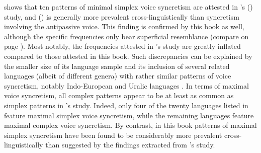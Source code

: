  shows that ten patterns of minimal simplex voice syncretism are attested in \citeauthor{geniusiene:1987}’s (\citeyear{geniusiene:1987}) study, and  () is generally more prevalent cross-linguistically than syncretism involving the antipassive voice. This finding is confirmed by this book as well, although the specific frequencies only bear superficial resemblance (compare  on page \pageref{tab:ch6:voice-syncretism-simplex}). Most notably, the frequencies attested in \citeauthor{geniusiene:1987}’s study are greatly inflated compared to those attested in this book. Such discrepancies can be explained by the smaller size of its language sample and its inclusion of several related languages (albeit of different genera) with rather similar patterns of voice syncretism, notably Indo-European and Uralic languages \citep[128f.]{geniusiene:1987}. In terms of maximal voice syncretism, all complex patterns appear to be at least as common as simplex patterns in \citeauthor{geniusiene:1987}’s study. Indeed, only four of the twenty languages listed in  feature maximal simplex voice syncretism, while the remaining languages feature maximal complex voice syncretism. By contrast, in this book patterns of maximal simplex syncretism have been found to be considerably more prevalent cross-linguistically than suggested by the findings extracted from \citeauthor{geniusiene:1987}’s study.

